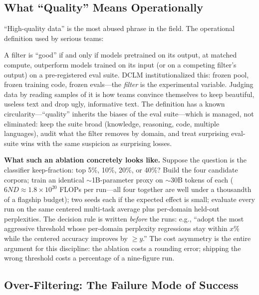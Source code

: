 \subsection{What ``Quality'' Means Operationally}

``High-quality data'' is the most abused phrase in the field. The operational definition used by serious teams:

\begin{keyinsight}
A filter is ``good'' if and only if models pretrained on its output, at matched compute, outperform models trained on its input (or on a competing filter's output) on a pre-registered eval suite. DCLM institutionalized this: frozen pool, frozen training code, frozen evals---the \textit{filter} is the experimental variable. Judging data by reading samples of it is how teams convince themselves to keep beautiful, useless text and drop ugly, informative text. The definition has a known circularity---``quality'' inherits the biases of the eval suite---which is managed, not eliminated: keep the suite broad (knowledge, reasoning, code, multiple languages), audit what the filter removes by domain, and treat surprising eval-suite wins with the same suspicion as surprising losses.
\end{keyinsight}

\textbf{What such an ablation concretely looks like.} Suppose the question is the classifier keep-fraction: top 5\%, 10\%, 20\%, or 40\%? Build the four candidate corpora; train an identical $\sim$1B-parameter proxy on $\sim$30B tokens of each ($6ND \approx 1.8 \times 10^{20}$ FLOPs per run---all four together are well under a thousandth of a flagship budget); two seeds each if the expected effect is small; evaluate every run on the same centered multi-task average plus per-domain held-out perplexities. The decision rule is written \textit{before} the runs: e.g., ``adopt the most aggressive threshold whose per-domain perplexity regressions stay within $x$\% while the centered accuracy improves by $\ge y$.'' The cost asymmetry is the entire argument for this discipline: the ablation costs a rounding error; shipping the wrong threshold costs a percentage of a nine-figure run.

\subsection{Over-Filtering: The Failure Mode of Success}

